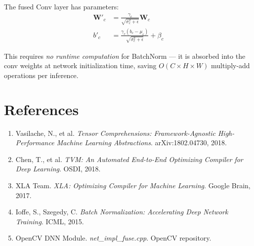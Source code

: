 \documentclass[12pt]{article}
\theoremstyle{definition}
\begin{document}
The fused Conv layer has parameters:
\begin{align}
\mathbf{W}'_c &= \frac{\gamma_c}{\sqrt{\sigma_c^2 + \epsilon}} \mathbf{W}_c \\
b'_c &= \frac{\gamma_c (b_c - \mu_c)}{\sqrt{\sigma_c^2 + \epsilon}} + \beta_c
\end{align}

This requires \emph{no runtime computation} for BatchNorm --- it is absorbed into the conv weights at network initialization time, saving $O(C \times H \times W)$ multiply-add operations per inference.

\section{References}

\begin{enumerate}
  \item Vasilache, N., et al. \textit{Tensor Comprehensions: Framework-Agnostic High-Performance Machine Learning Abstractions}. arXiv:1802.04730, 2018.
  \item Chen, T., et al. \textit{TVM: An Automated End-to-End Optimizing Compiler for Deep Learning}. OSDI, 2018.
  \item XLA Team. \textit{XLA: Optimizing Compiler for Machine Learning}. Google Brain, 2017.
  \item Ioffe, S., Szegedy, C. \textit{Batch Normalization: Accelerating Deep Network Training}. ICML, 2015.
  \item OpenCV DNN Module. \textit{net\_impl\_fuse.cpp}. OpenCV repository.
\end{enumerate}
\end{document}
